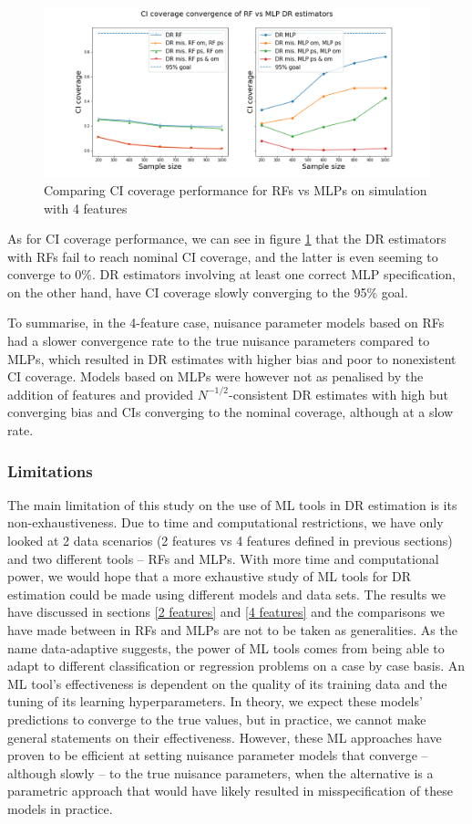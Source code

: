 \documentclass[12pt,twoside]{article}
\begin{document}
\begin{figure}[h!]
    \centering
    \includegraphics[width = 0.9\columnwidth]{figures/CIcompare_moreW.png}
    \caption{Comparing CI coverage performance for RFs vs MLPs on simulation with 4 features}
    \label{CIcompare_moreW}
\end{figure}

As for CI coverage performance, we can see in figure \ref{CIcompare_moreW} that the DR estimators with RFs fail to reach nominal CI coverage, and the latter is even seeming to converge to 0\%. DR estimators involving at least one correct MLP specification, on the other hand, have CI coverage slowly converging to the 95\% goal.

To summarise, in the 4-feature case, nuisance parameter models based on RFs had a slower convergence rate to the true nuisance parameters compared to MLPs, which resulted in DR estimates with higher bias and poor to nonexistent CI coverage. Models based on MLPs were however not as penalised by the addition of features and provided $N^{-1/2}$-consistent DR estimates with high but converging bias and CIs converging to the nominal coverage, although at a slow rate.

\subsubsection{Limitations}

The main limitation of this study on the use of ML tools in DR estimation is its non-exhaustiveness. Due to time and computational restrictions, we have only looked at 2 data scenarios (2 features vs 4 features defined in previous sections) and two different tools -- RFs and MLPs. With more time and computational power, we would hope that a more exhaustive study of ML tools for DR estimation could be made using different models and data sets. The results we have discussed in sections \ref{2 features} and \ref{4 features} and the comparisons we have made between in RFs and MLPs are not to be taken as generalities. As the name data-adaptive suggests, the power of ML tools comes from being able to adapt to different classification or regression problems on a case by case basis. An ML tool's effectiveness is dependent on the quality of its training data and the tuning of its learning hyperparameters. In theory, we expect these models' predictions to converge to the true values, but in practice, we cannot make general statements on their effectiveness. However, these ML approaches have proven to be efficient at setting nuisance parameter models that converge -- although slowly -- to the true nuisance parameters, when the alternative is a parametric approach that would have likely resulted in misspecification of these models in practice. 
\end{document}
